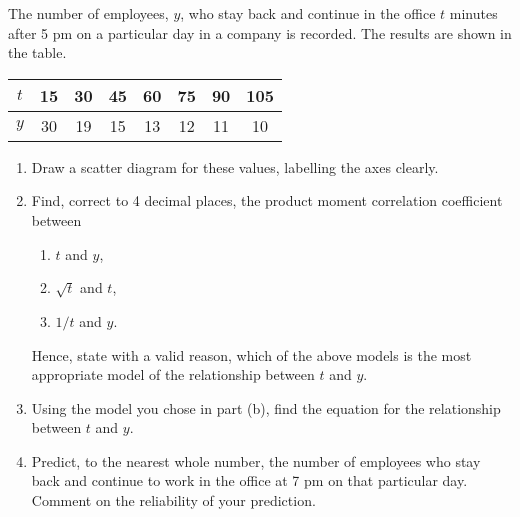 \begin{problem}
    The number of employees, $y$, who stay back and continue in the office $t$ minutes after 5 pm on a particular day in a company is recorded. The results are shown in the table.

    \begin{table}[H]
        \centering
        \begin{tabular}{|c|c|c|c|c|c|c|c|}
        \hline
        $t$ & 15 & 30 & 45 & 60 & 75 & 90 & 105 \\ \hline
        $y$ & 30 & 19 & 15 & 13 & 12 & 11 & 10 \\ \hline
        \end{tabular}
    \end{table}

    \begin{enumerate}
        \item Draw a scatter diagram for these values, labelling the axes clearly.
        \item Find, correct to 4 decimal places, the product moment correlation coefficient between
        \begin{enumerate}
            \item $t$ and $y$,
            \item $\sqrt{t}$ and $t$,
            \item $1/t$ and $y$.
        \end{enumerate}
        Hence, state with a valid reason, which of the above models is the most appropriate model of the relationship between $t$ and $y$.
        \item Using the model you chose in part (b), find the equation for the relationship between $t$ and $y$.
        \item Predict, to the nearest whole number, the number of employees who stay back and continue to work in the office at 7 pm on that particular day. Comment on the reliability of your prediction.
    \end{enumerate}
\end{problem}
